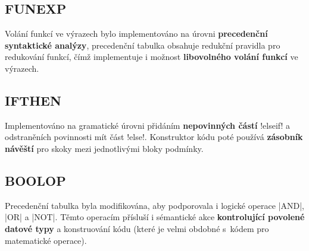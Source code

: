 \begin{multicols}{2}
\subsection{FUNEXP}
Volání funkcí ve výrazech bylo implementováno na úrovni \textbf{precedenční syntaktické analýzy},
precedenční tabulka obsahuje redukční pravidla pro redukování funkcí, čímž implementuje i
možnost \textbf{libovolného volání funkcí} ve výrazech.

\subsection{IFTHEN}
Implementováno na gramatické úrovni přidáním \textbf{nepovinných částí}
\ic!elseif! a odstraněních povinnosti mít část \ic!else!.
Konstruktor kódu poté používá \textbf{zásobník návěští} pro skoky mezi jednotlivými bloky podmínky.

\subsection{BOOLOP}
Precedenční tabulka byla modifikována, aby podporovala i logické operace \ic|AND|, \ic|OR| a \ic|NOT|.
Těmto operacím přísluší i sémantické akce \textbf{kontrolující povolené datové typy} a konstruování kódu (které je velmi obdobné s~kódem pro matematické operace).

\end{multicols}